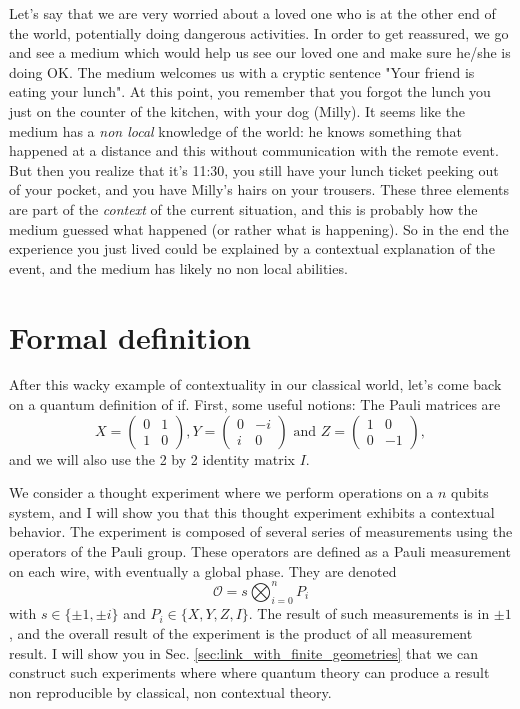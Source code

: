 \documentclass{article}
\begin{document}
Let's say that we are very worried about a loved one who is at the other end of
the world, potentially doing dangerous activities. In order to get reassured, we
go and see a medium which would help us see our loved one and make sure he/she
is doing OK. The medium welcomes us with a cryptic sentence "Your friend is
eating your lunch". At this point, you remember that you forgot the lunch you
just on the counter of the kitchen, with your dog (Milly). It seems like the
medium has a \emph{non local} knowledge of the world: he knows something that
happened at a distance and this without communication with the remote event. But
then you realize that it's 11:30, you still have your lunch ticket peeking out
of your pocket, and you have Milly's hairs on your trousers. These three
elements are part of the \emph{context} of the current situation, and this is
probably how the medium guessed what happened (or rather what is happening). So
in the end the experience you just lived could be explained by a contextual
explanation of the event, and the medium has likely no non local abilities.

\section{Formal definition}
\label{sec:formal_definition}

After this wacky example of contextuality in our classical world, let's come back
on a quantum definition of if. First, some useful notions: The Pauli matrices are
$$X=\begin{pmatrix}
  0 & 1\\
  1 & 0
\end{pmatrix},Y=\begin{pmatrix}
  0 &  -i\\
  i & 0
\end{pmatrix} \text{ and } Z=\begin{pmatrix}
  1 & 0\\
  0 &-1
\end{pmatrix},$$
and we will also use the 2 by 2 identity matrix $I$.

We consider a thought experiment where we perform operations on a $n$ qubits
system, and I will show you that this thought experiment exhibits a contextual
behavior. The experiment is composed of several series of measurements using the
operators of the Pauli group. These operators are defined as a Pauli measurement
on each wire, with eventually a global phase. They are denoted
$$\mathcal{O} = s\bigotimes_{i=0}^n P_i$$
with $s\in\{\pm 1, \pm i\}$ and $P_i\in\{X,Y,Z,I\}$.
The result of such measurements is in $\pm 1$, and the overall result of the
experiment is the product of all measurement result. I will show you in Sec. 
\ref{sec:link_with_finite_geometries} that we can construct such experiments
where where quantum theory can produce a result non reproducible by classical,
non contextual theory.
\end{document}
